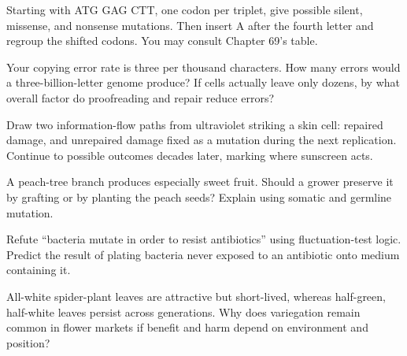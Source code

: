\begin{sikaoti}
\item Starting with ATG GAG CTT, one codon per triplet, give possible silent, missense, and nonsense mutations. Then insert A after the fourth letter and regroup the shifted codons. You may consult Chapter 69's table.
\item Your copying error rate is three per thousand characters. How many errors would a three-billion-letter genome produce? If cells actually leave only dozens, by what overall factor do proofreading and repair reduce errors?
\item Draw two information-flow paths from ultraviolet striking a skin cell: repaired damage, and unrepaired damage fixed as a mutation during the next replication. Continue to possible outcomes decades later, marking where sunscreen acts.
\item A peach-tree branch produces especially sweet fruit. Should a grower preserve it by grafting or by planting the peach seeds? Explain using somatic and germline mutation.
\item Refute ``bacteria mutate in order to resist antibiotics'' using fluctuation-test logic. Predict the result of plating bacteria never exposed to an antibiotic onto medium containing it.
\item All-white spider-plant leaves are attractive but short-lived, whereas half-green, half-white leaves persist across generations. Why does variegation remain common in flower markets if benefit and harm depend on environment and position?
\end{sikaoti}
